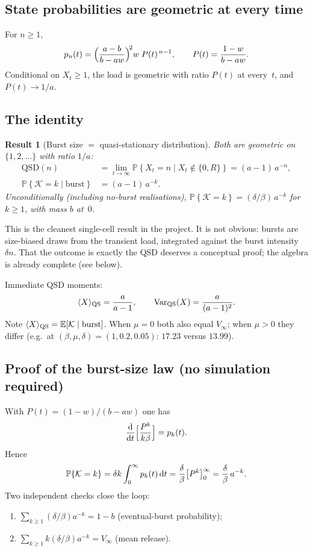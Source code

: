 \documentclass[11pt,a4paper]{article}
\newcommand{\dd}{{\rm d}}
\newcommand{\E}{\mathbb{E}}
\newcommand{\Prob}[1]{\mathbb{P}\!\left\{#1\right\}}
\newcommand{\xt}{X_t}
\newcommand{\Kb}{\mathcal{K}}
\theoremstyle{plain}
\newtheorem{result}{Result}[section]
\theoremstyle{definition}
\theoremstyle{remark}
\begin{document}
\subsection{State probabilities are geometric at every time}

For $n\ge 1$,
\begin{equation}
p_n(t)=\Bigl(\frac{a-b}{b-aw}\Bigr)^{\!2}w\;P(t)^{\,n-1},
\qquad P(t)=\frac{1-w}{b-aw}.
\end{equation}
Conditional on $\xt\ge 1$, the load is geometric with ratio $P(t)$ at every~$t$,
and $P(t)\to 1/a$.

\subsection{The identity}

\begin{result}[Burst size $=$ quasi-stationary distribution]
Both are geometric on $\{1,2,\dots\}$ with ratio $1/a$:
\begin{align}
\mathrm{QSD}(n)
&=\lim_{t\to\infty}\Prob{\xt=n\mid \xt\notin\{0,R\}}
=(a-1)\,a^{-n},\\
\Prob{\Kb=k\mid\text{burst}}
&=(a-1)\,a^{-k}.
\end{align}
Unconditionally (including no-burst realisations),
$\Prob{\Kb=k}=(\delta/\beta)\,a^{-k}$ for $k\ge 1$, with mass $b$ at~$0$.
\end{result}

This is the cleanest single-cell result in the project. It is not obvious:
bursts are size-biased draws from the transient load, integrated against the
burst intensity $\delta n$. That the outcome is exactly the QSD deserves a
conceptual proof; the algebra is already complete (see below).

Immediate QSD moments:
\begin{equation}
\langle X\rangle_{\rm QS}=\frac{a}{a-1},\qquad
\mathrm{Var}_{\rm QS}(X)=\frac{a}{(a-1)^2}.
\end{equation}
Note $\langle X\rangle_{\rm QS}=\E[\Kb\mid\text{burst}]$. When $\mu=0$ both also
equal $V_\infty$; when $\mu>0$ they differ
(e.g.\ at $(\beta,\mu,\delta)=(1,0.2,0.05)$: $17.23$ versus $13.99$).

\subsection{Proof of the burst-size law (no simulation required)}

With $P(t)=(1-w)/(b-aw)$ one has
\[
\frac{\dd}{\dd t}\Bigl[\frac{P^k}{k\beta}\Bigr]=p_k(t).
\]
Hence
\[
\Prob{\Kb=k}
=\delta k\int_0^\infty p_k(t)\,\dd t
=\frac{\delta}{\beta}\bigl[P^k\bigr]_0^\infty
=\frac{\delta}{\beta}\,a^{-k}.
\]
Two independent checks close the loop:
\begin{enumerate}
\item $\sum_{k\ge 1}(\delta/\beta)a^{-k}=1-b$ (eventual-burst probability);
\item $\sum_{k\ge 1}k(\delta/\beta)a^{-k}=V_\infty$ (mean release).
\end{enumerate}
\end{document}
